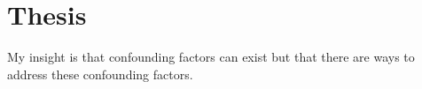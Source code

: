







\section{Thesis}

My insight is that confounding factors can exist but that
there are ways to address these confounding factors.

